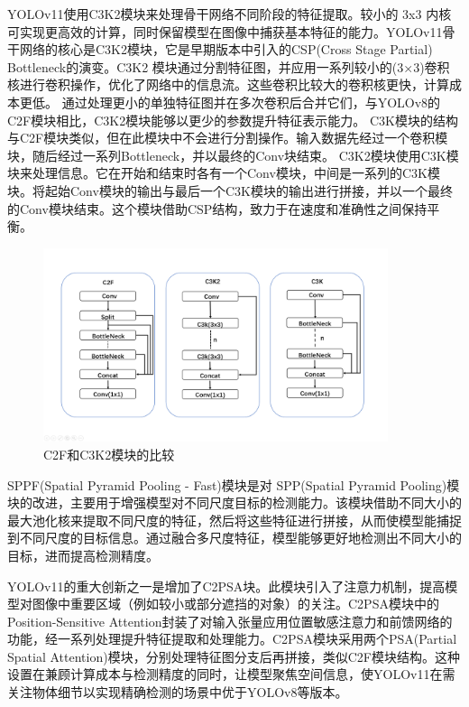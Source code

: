YOLOv11使用C3K2模块来处理骨干网络不同阶段的特征提取。较小的 3x3 内核可实现更高效的计算，同时保留模型在图像中捕获基本特征的能力。YOLOv11骨干网络的核心是C3K2模块，它是早期版本中引入的CSP(Cross Stage Partial) Bottleneck的演变。C3K2 模块通过分割特征图，并应用一系列较小的(3×3)卷积核进行卷积操作，优化了网络中的信息流。这些卷积比较大的卷积核更快，计算成本更低。
通过处理更小的单独特征图并在多次卷积后合并它们，与YOLOv8的C2F模块相比，C3K2模块能够以更少的参数提升特征表示能力。
C3K模块的结构与C2F模块类似，但在此模块中不会进行分割操作。输入数据先经过一个卷积模块，随后经过一系列Bottleneck，并以最终的Conv块结束。
C3K2模块使用C3K模块来处理信息。它在开始和结束时各有一个Conv模块，中间是一系列的C3K模块。将起始Conv模块的输出与最后一个C3K模块的输出进行拼接，并以一个最终的Conv模块结束。这个模块借助CSP结构，致力于在速度和准确性之间保持平衡。

\begin{figure}[!htb]
  \centering
  \includegraphics[width=0.9\textwidth]{figs/chap02/c2f.png}
  \caption{C2F和C3K2模块的比较}
  \label{fig:c3k}
\end{figure}

SPPF(Spatial Pyramid Pooling - Fast)模块是对 SPP(Spatial Pyramid Pooling)模块的改进，主要用于增强模型对不同尺度目标的检测能力。该模块借助不同大小的最大池化核来提取不同尺度的特征，然后将这些特征进行拼接，从而使模型能捕捉到不同尺度的目标信息。通过融合多尺度特征，模型能够更好地检测出不同大小的目标，进而提高检测精度。

YOLOv11的重大创新之一是增加了C2PSA块。此模块引入了注意力机制，提高模型对图像中重要区域（例如较小或部分遮挡的对象）的关注。C2PSA模块中的Position-Sensitive Attention封装了对输入张量应用位置敏感注意力和前馈网络的功能，经一系列处理提升特征提取和处理能力。C2PSA模块采用两个PSA(Partial Spatial Attention)模块，分别处理特征图分支后再拼接，类似C2F模块结构。这种设置在兼顾计算成本与检测精度的同时，让模型聚焦空间信息，使YOLOv11在需关注物体细节以实现精确检测的场景中优于YOLOv8等版本。

